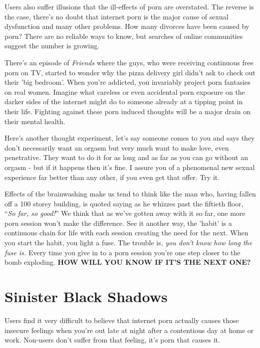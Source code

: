 \documentclass[
]{book}
\begin{document}
Users also suffer illusions that the ill-effects of porn are overstated. The reverse is the case, there's no doubt that internet porn is the major cause of sexual dysfunction and many other problems. How many divorces have been caused by porn? There are no reliable ways to know, but searches of online communities suggest the number is growing.

There's an episode of \emph{Friends} where the guys, who were receiving continuous free porn on TV, started to wonder why the pizza delivery girl didn't ask to check out their 'big bedroom'. When you're addicted, you invariably project porn fantasies on real women. Imagine what careless or even accidental porn exposure on the darker sides of the internet might do to someone already at a tipping point in their life. Fighting against these porn induced thoughts will be a major drain on their mental health.

Here's another thought experiment, let's say someone comes to you and says they don't necessarily want an orgasm but very much want to make love, even penetrative. They want to do it for as long and as far as you can go without an orgasm - but if it happens then it's fine. I assure you of a phenomenal new sexual experience far better than any other, if you even get that offer. Try it.

Effects of the brainwashing make us tend to think like the man who, having fallen off a 100 storey building, is quoted saying as he whizzes past the fiftieth floor, ``\emph{So far, so good!}'' We think that as we've gotten away with it so far, one more porn session won't make the difference. See it another way, the 'habit' is a continuous chain for life with each session creating the need for the next. When you start the habit, you light a fuse. The trouble is, \emph{you don't know how long the fuse is.} Every time you give in to a porn session you're one step closer to the bomb exploding. \textbf{HOW WILL YOU KNOW IF IT'S THE NEXT ONE?}

\hypertarget{sinister-black-shadows}{%
\section{Sinister Black Shadows}\label{sinister-black-shadows}}

Users find it very difficult to believe that internet porn actually causes those insecure feelings when you're out late at night after a contentious day at home or work. Non-users don't suffer from that feeling, it's porn that causes it.
\end{document}
